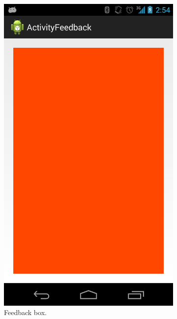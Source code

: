 \documentclass[a4paper,10pt,english,lof,lot,twoside]{puthesis}
\begin{document}
\begin{figure}
\begin{subfigure}[t]{0.30\linewidth}
\includegraphics[width=0.800\linewidth]{early-prototype-feedback-box.png}
\caption[Feedback box]{Feedback box.}\label{ch-design/index:fig-early-prototype-feedback-box}\end{subfigure}
\begin{subfigure}[t]{0.30\linewidth}
\centering
\capstart


\end{subfigure}
\end{figure}
\end{document}

